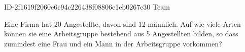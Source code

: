 \begin{exercise}
      {ID-2f1619f2060e6c94c226438f08806e1eb0267e30}
      {Team}
  \ifproblem\problem\par
    Eine Firma hat 20 Angestellte, davon sind 12 männlich. Auf wie viele
    Arten können sie eine Arbeitsgruppe bestehend aus 5 Angestellten bilden,
    so dass zumindest eine Frau und ein Mann in der Arbeitsgruppe vorkommen?
  \fi
\end{exercise}
